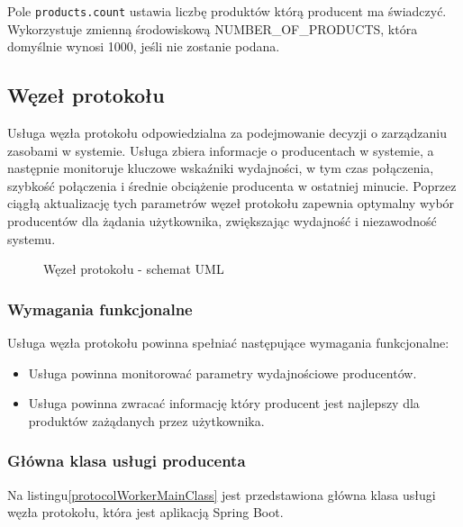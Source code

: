 Pole \verb|products.count| ustawia liczbę produktów którą producent ma świadczyć. Wykorzystuje zmienną środowiskową NUMBER\_OF\_PRODUCTS, która domyślnie wynosi 1000, jeśli nie zostanie podana.

\subsection{Węzeł protokołu}

Usługa węzła protokołu odpowiedzialna za podejmowanie decyzji o zarządzaniu zasobami w systemie. Usługa zbiera informacje o producentach w systemie, a następnie monitoruje kluczowe wskaźniki wydajności, w tym czas połączenia, szybkość połączenia i średnie obciążenie producenta w ostatniej minucie. Poprzez ciągłą aktualizację tych parametrów węzeł protokołu zapewnia optymalny wybór producentów dla żądania użytkownika, zwiększając wydajność i niezawodność systemu.

\begin{figure}[!htbp]
    \centering
    
    \caption{Węzeł protokołu - schemat UML}
    \label{WorkerUML}
\end{figure}

\subsubsection{Wymagania funkcjonalne}

Usługa węzła protokołu powinna spełniać następujące wymagania funkcjonalne:

\begin{itemize}
    \item Usługa powinna monitorować parametry wydajnościowe producentów.
    \item Usługa powinna zwracać informację który producent jest najlepszy dla produktów zażądanych przez użytkownika.
\end{itemize}

\subsubsection{Główna klasa usługi producenta}

Na listingu\ref{protocolWorkerMainClass} jest przedstawiona główna klasa usługi węzła protokołu, która jest aplikacją Spring Boot.

